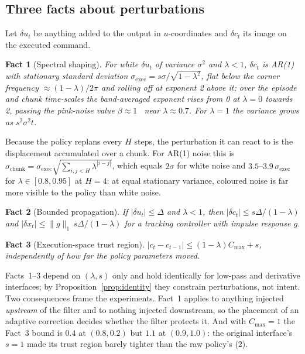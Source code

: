 \documentclass{article}
\newtheorem{fact}{Fact}
\newcommand{\sexec}{\sigma_{\mathrm{exec}}}
\newcommand{\schunk}{\sigma_{\mathrm{chunk}}}
\begin{document}
\subsection{Three facts about perturbations}

Let $\delta u_t$ be anything added to the output in $u$-coordinates and $\delta c_t$ its image on the executed command.

\begin{fact}[Spectral shaping]
\label{fact:spectrum}
For white $\delta u_t$ of variance $\sigma^2$ and $\lambda<1$, $\delta c_t$ is AR(1) with stationary standard deviation $\sexec=s\sigma/\sqrt{1-\lambda^2}$, flat below the corner frequency $\approx(1-\lambda)/2\pi$ and rolling off at exponent 2 above it; over the episode and chunk time-scales the band-averaged exponent rises from 0 at $\lambda=0$ towards 2, passing the pink-noise value $\beta\approx1$~\citep{eberhard2023pink} near $\lambda\approx0.7$. For $\lambda=1$ the variance grows as $s^2\sigma^2t$.
\end{fact}
Because the policy replans every $H$ steps, the perturbation it can react to is the displacement accumulated over a chunk. For AR(1) noise this is $\schunk=\sexec\sqrt{\sum_{i,j<H}\lambda^{|i-j|}}$, which equals $2\sigma$ for white noise and $3.5$--$3.9\,\sexec$ for $\lambda\in[0.8,0.95]$ at $H=4$: at equal stationary variance, coloured noise is far more visible to the policy than white noise.

\begin{fact}[Bounded propagation]
If $|\delta u_t|\le\Delta$ and $\lambda<1$, then $|\delta c_t|\le s\Delta/(1-\lambda)$ and $|\delta x_t|\le\|g\|_1\,s\Delta/(1-\lambda)$ for a tracking controller with impulse response $g$.
\end{fact}

\begin{fact}[Execution-space trust region]
$|c_t-c_{t-1}|\le(1-\lambda)C_{\max}+s$, independently of how far the policy parameters moved.
\end{fact}

Facts~1--3 depend on $(\lambda,s)$ only and hold identically for low-pass and derivative interfaces; by Proposition~\ref{prop:identity} they constrain perturbations, not intent. Two consequences frame the experiments. Fact~1 applies to anything injected \emph{upstream} of the filter and to nothing injected downstream, so the placement of an adaptive correction decides whether the filter protects it. And with $C_{\max}=1$ the Fact~3 bound is $0.4$ at $(0.8,0.2)$ but $1.1$ at $(0.9,1.0)$: the original interface's $s=1$ made its trust region barely tighter than the raw policy's ($2$).
\end{document}
